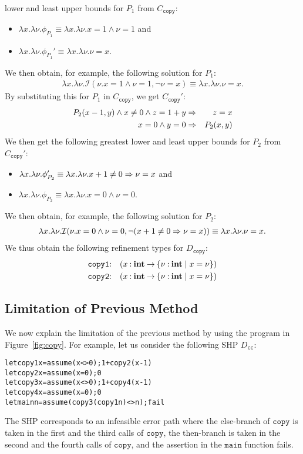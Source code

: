 lower and least upper bounds for \(P_1\) from \(C_{\texttt{copy}}\):
\begin{itemize}
\item \(\lambda x.\lambda \nu.\phi_{P_1}\equiv \lambda x.\lambda \nu.x=1 \land \nu=1\) and
\item \(\lambda x.\lambda \nu.\phi_{P_1}'\equiv \lambda x.\lambda \nu.\nu=x\).
\end{itemize}
We then obtain, for example, the following solution for \(P_1\):
\begin{eqnarray*}
\lambda x.\lambda \nu.\mathcal{I}(\nu.x=1 \land \nu=1,\neg \nu=x) \equiv \lambda x.\lambda \nu.\nu=x.
\end{eqnarray*}
By substituting this for \(P_1\) in \(C_{\texttt{copy}}\), we get 
\(C_{\texttt{copy}}'\):
\begin{eqnarray*}
P_2(x-1,y) \land x\neq0 \land z=1+y &\Rightarrow& z=x \\
x=0 \land y=0 &\Rightarrow& P_2(x,y)
\end{eqnarray*}
We then get the following greatest lower and least upper bounds for 
\(P_2\) from \(C_{\texttt{copy}}'\):
\begin{itemize}
\item \(\lambda x.\lambda \nu. \phi_{P_2}' \equiv \lambda x.\lambda \nu. x+1\neq0 \Rightarrow \nu=x\) and
\item \(\lambda x.\lambda \nu. \phi_{P_2} \equiv \lambda x.\lambda \nu. x=0 \land \nu=0\).
\end{itemize}
We then obtain, for example, the following solution for \(P_2\):
\begin{eqnarray*}
\lambda x.\lambda \nu.\mathcal{I}(\nu.x=0 \land \nu=0,\neg (x+1\neq0 \Rightarrow \nu=x)) \equiv \lambda x.\lambda \nu.\nu=x.
\end{eqnarray*}
We thus obtain the following refinement types for \(D_{\texttt{copy}}\):
\begin{eqnarray*}
\texttt{copy1}&\mathbin{:}&(x\mathbin{:}{\mathbf{int}}\mathbin{\rightarrow}{\{{\nu\mathbin{:}\mathbf{int} \mid x=\nu}\}}) \\
\texttt{copy2}&\mathbin{:}&(x\mathbin{:}{\mathbf{int}}\mathbin{\rightarrow}{\{{\nu\mathbin{:}\mathbf{int} \mid x=\nu}\}})
\end{eqnarray*}

\subsection{Limitation of Previous Method}
\label{sec:limit}

We now explain the limitation of the previous method by using the 
program in Figure~\ref{fig:copy}.  For example, let us consider the 
following SHP \(D_{\texttt{cc}}\):
\begin{alltt}
let copy1 x = assume (x<>0); 1 + copy2 (x-1)
let copy2 x = assume (x=0); 0
let copy3 x = assume (x<>0); 1 + copy4 (x-1)
let copy4 x = assume (x=0); 0
let main n = assume (copy3 (copy1 n) <> n); fail
\end{alltt}
The SHP corresponds to an infeasible error path where the else-branch of 
\(\texttt{copy}\) is taken in the first and the third calls of 
\(\texttt{copy}\), the then-branch is taken in the second and the fourth 
calls of \(\texttt{copy}\), and the assertion in the \(\texttt{main}\) 
function fails.

